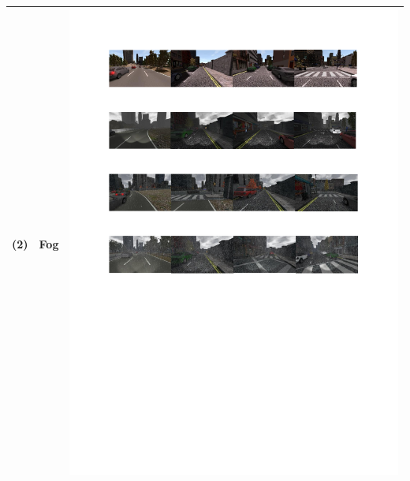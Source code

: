 \documentclass{svproc}
\begin{document}
\begin{table}[!t]
\begin{tabular}{|C{1.5cm}|c|C{8.5cm}|}
			(2) & Fog	& \begin{minipage}{.9\textwidth}\includegraphics[scale=.5,trim=2cm 20.5cm 2cm 6.5cm,clip]{examples.pdf}\end{minipage} \\ \hline

\end{tabular}
\end{table}
\end{document}
